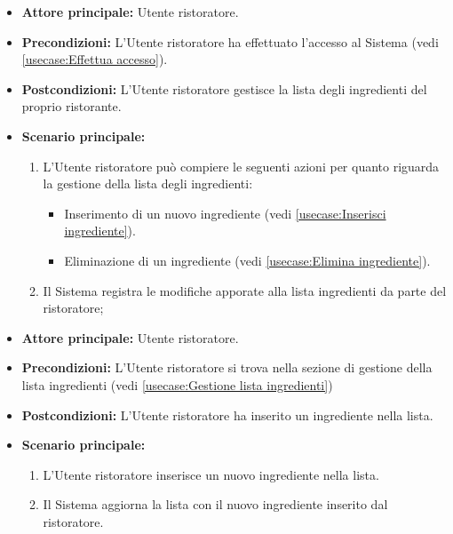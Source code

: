 \label{usecase:Gestione lista ingredienti}
\begin{itemize}
	\item \textbf{Attore principale:} Utente ristoratore.

	\item \textbf{Precondizioni:} L'Utente ristoratore ha effettuato l'accesso al Sistema (vedi \autoref{usecase:Effettua accesso}).

	\item \textbf{Postcondizioni:} L'Utente ristoratore gestisce la lista degli ingredienti del proprio ristorante.


	\item \textbf{Scenario principale:}
	      \begin{enumerate}

		      \item L'Utente ristoratore può compiere le seguenti azioni per quanto riguarda la gestione della lista degli ingredienti:
		      \begin{itemize}
                \item Inserimento di un nuovo ingrediente (vedi \autoref{usecase:Inserisci ingrediente}).
                \item Eliminazione di un ingrediente (vedi \autoref{usecase:Elimina ingrediente}).
              \end{itemize}
		      \item Il Sistema registra le modifiche apporate alla lista ingredienti da parte del ristoratore;

	      \end{enumerate}
\end{itemize}

\label{usecase:Inserisci ingrediente}
\begin{itemize}

	\item \textbf{Attore principale:} Utente ristoratore.

	\item \textbf{Precondizioni:} L'Utente ristoratore si trova nella sezione di gestione della lista ingredienti (vedi \autoref{usecase:Gestione lista ingredienti})

	\item \textbf{Postcondizioni:} L'Utente ristoratore ha inserito un ingrediente nella lista.

	\item \textbf{Scenario principale:}
	\begin{enumerate}
		\item L'Utente ristoratore inserisce un nuovo ingrediente nella lista.
		\item Il Sistema aggiorna la lista con il nuovo ingrediente inserito dal ristoratore.
	\end{enumerate}

\end{itemize}


